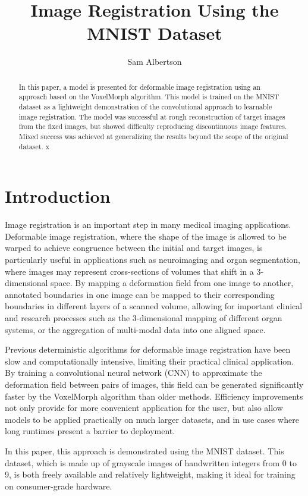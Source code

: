 \documentclass{article} %
\title{Image Registration Using the MNIST Dataset}
\author{Sam Albertson}
\begin{document}
\maketitle

\begin{abstract}
In this paper, a model is presented for deformable image registration using an approach based on the VoxelMorph algorithm. This model is trained on the MNIST dataset as a lightweight demonstration of the convolutional approach to learnable image registration. The model was successful at rough reconstruction of target images from the fixed images, but showed difficulty reproducing discontinuous image features. Mixed success was achieved at generalizing the results beyond the scope of the original dataset. x

\end{abstract}

\section{Introduction}
Image registration is an important step in many medical imaging applications. Deformable image registration, where the shape of the image is allowed to be warped to achieve congruence between the initial and target images, is particularly useful in applications such as neuroimaging and organ segmentation, where images may represent cross-sections of volumes that shift in a 3-dimensional space. By mapping a deformation field from one image to another, annotated boundaries in one image can be mapped to their corresponding boundaries in different layers of a scanned volume, allowing for important clinical and research processes such as the 3-dimensional mapping of different organ systems, or the aggregation of multi-modal data into one aligned space.

Previous deterministic algorithms for deformable image registration have been slow and computationally intensive, limiting their practical clinical application. By training a convolutional neural network (CNN) to approximate the deformation field between pairs of images, this field can be generated significantly faster by the VoxelMorph algorithm than older methods. Efficiency improvements not only provide for more convenient application for the user, but also allow models to be applied practically on much larger datasets, and in use cases where long runtimes present a barrier to deployment. 

In this paper, this approach is demonstrated using the MNIST dataset. This dataset, which is made up of 
grayscale images of handwritten integers from 0 to 9, is both freely available and relatively lightweight, making it ideal for training on consumer-grade hardware. 
\end{document}
